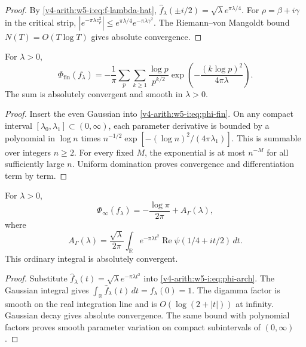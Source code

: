 \begin{proof}
By \eqref{v4-arith:w5-i:eq:f-lambda-hat},
\(\widehat{f}_{\lambda}(\pm i/2)=\sqrt{\lambda}e^{\pi\lambda/4}\).
For \(\rho=\beta+i\gamma\) in the critical strip,
\(|e^{-\pi\lambda z_{\rho}^{2}}|
\leq e^{\pi\lambda/4}e^{-\pi\lambda\gamma^{2}}\). The
Riemann--von Mangoldt bound \(N(T)=O(T\log T)\) gives absolute
convergence.
\end{proof}

\begin{lemma}
\label{v4-arith:w5-i:lem:prime-side}

For $\lambda>0$,
\begin{equation}
 \Phi_{\mathrm{fin}}(f_\lambda)
 =-\frac1\pi\sum_p\sum_{k\geq1}\frac{\log p}{p^{k/2}}
       \exp\left(-\frac{(k\log p)^2}{4\pi\lambda}\right).
 \label{v4-arith:w5-i:eq:phi-fin-eval}
\end{equation}
The sum is absolutely convergent and smooth in $\lambda>0$.
\end{lemma}
\begin{proof}
Insert the even Gaussian into \eqref{v4-arith:w5-i:eq:phi-fin}.
On any compact interval $[\lambda_0,\lambda_1]\subset(0,\infty)$,
each parameter derivative is bounded by a polynomial in $\log n$
times $n^{-1/2}\exp[-(\log n)^2/(4\pi\lambda_1)]$.
This is summable over integers $n\geq2$.
For every fixed $M$, the exponential is at most $n^{-M}$
for all sufficiently large $n$.
Uniform domination proves convergence and differentiation term by term.
\end{proof}

\begin{lemma}
\label{v4-arith:w5-i:lem:arch}

For $\lambda>0$,
\begin{equation}
 \Phi_\infty(f_\lambda)=-\frac{\log\pi}{2\pi}+A_\Gamma(\lambda),
 \label{v4-arith:w5-i:eq:phi-arch-eval}
\end{equation}
where
\begin{equation}
 A_\Gamma(\lambda)=\frac{\sqrt\lambda}{2\pi}
 \int_{\mathbb R}e^{-\pi\lambda t^2}
                \operatorname{Re}\psi(1/4+it/2)\,dt.
 \label{v4-arith:w5-i:eq:A-gamma}
\end{equation}
This ordinary integral is absolutely convergent.
\end{lemma}
\begin{proof}
Substitute $\widehat f_\lambda(t)=\sqrt\lambda e^{-\pi\lambda t^2}$
into \eqref{v4-arith:w5-i:eq:phi-arch}.
The Gaussian integral gives
$\int_{\mathbb R}\widehat f_\lambda(t)\,dt=f_\lambda(0)=1$.
The digamma factor is smooth on the real integration line and
is $O(\log(2+|t|))$ at infinity.
Gaussian decay gives absolute convergence.
The same bound with polynomial factors proves smooth parameter
variation on compact subintervals of $(0,\infty)$.
\end{proof}

